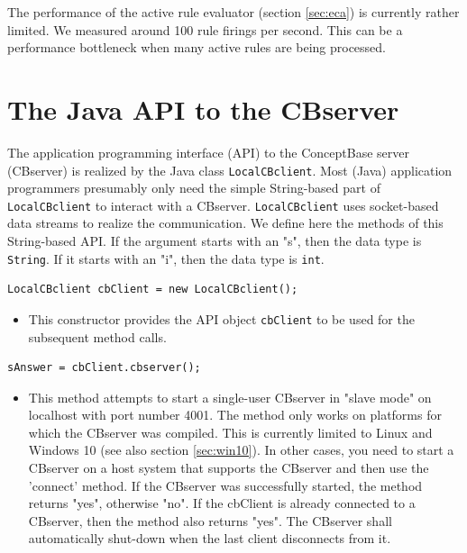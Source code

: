 The performance of the active rule evaluator (section \ref{sec:eca}) is currently 
rather limited. We measured around 100 rule firings per second. This can be a 
performance bottleneck when many active rules are being processed.



\section{The Java API to the CBserver}
\label{sec:javaapi}

The application programming interface (API)
to the ConceptBase server (CBserver) is realized by the Java class 
{\tt LocalCBclient}.
Most (Java) application programmers presumably only need the simple String-based
part of {\tt LocalCBclient} to interact with a CBserver. {\tt LocalCBclient} uses
socket-based data streams to realize the communication.
We define here the methods of this String-based API. If the argument starts with an "s",
then the data type is {\tt String}. If it starts with an "i", then the data type
is {\tt int}.


\begin{verbatim}
LocalCBclient cbClient = new LocalCBclient();
\end{verbatim}

\begin{itemize}
\item This constructor provides the API object {\tt cbClient} to be used for the
subsequent method calls.
\end{itemize}

\begin{verbatim}
sAnswer = cbClient.cbserver();
\end{verbatim}

\begin{itemize}
\item This method attempts to start a single-user CBserver in "slave mode" 
on localhost with port number 4001.
The method only works on platforms for which the CBserver was compiled. This is currently
limited to Linux and Windows 10 (see also section \ref{sec:win10}). In other cases,
you need to start a CBserver on a host system that supports the CBserver and then use the 'connect'
method. If the CBserver was successfully started, the method returns "yes", otherwise "no".
If the cbClient is already connected to a CBserver, then the method also returns "yes".
The CBserver shall automatically shut-down when the last client disconnects from it.
\end{itemize}

